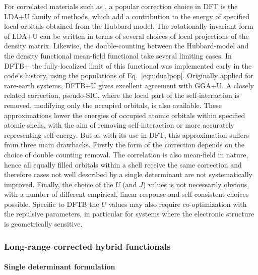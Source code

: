 \documentclass[reprint,onecolumn,superscriptaddress]{revtex4-1}
\newcommand{\dftbp}{DFTB+}
\begin{document}
For correlated materials such as , a popular correction choice in DFT is
the LDA+U family of methods,\cite{Anisimov_1997} which add a contribution to the
energy of specified local orbitals obtained from the Hubbard model. The
rotationally invariant\cite{PhysRevB.57.1505} form of LDA+U can be written in
terms of several choices of local projections of the density
matrix.\cite{PhysRevB.73.045110} Likewise, the double-counting between the
Hubbard-model and the density functional mean-field functional take several
limiting cases.\cite{PhysRevB.67.153106} In \dftbp{} the fully-localized limit
of this functional was implemented early in the code's
history,\cite{hourahine07} using the populations of
Eq.~\eqref{eqn:dualpop}. Originally applied for rare-earth
systems,\cite{doi:10.1002/pssc.200778667} DFTB+U gives excellent agreement with
GGA+U.\cite{doi:10.1063/1.5085190} A closely related correction,
pseudo-SIC,\cite{PhysRevB.67.125109} where the local part of the
self-interaction is removed, modifying only the occupied orbitals, is also
available.  These approximations lower the energies of occupied atomic orbitals
within specified atomic shells, with the aim of removing self-interaction or
more accurately representing self-energy. But as with its use in DFT, this
approximation suffers from three main drawbacks. Firstly the form of the
correction depends on the choice of double counting
removal.\cite{PhysRevB.79.035103} The correlation is also mean-field in nature,
hence all equally filled orbitals within a shell receive the same correction and
therefore cases not well described by a single determinant are not
systematically improved. Finally, the choice of the $U$ (and $J$) values is not
necessarily obvious, with a number of different empirical, linear response and
self-consistent choices possible. Specific to
DFTB\cite{doi:10.1021/acs.jpcc.6b10557} the $U$ values may also require
co-optimization with the repulsive parameters, in particular for systems where
the electronic structure is geometrically sensitive.

\subsubsection{Long-range corrected hybrid functionals}

\paragraph{Single determinant formulation}
\end{document}
